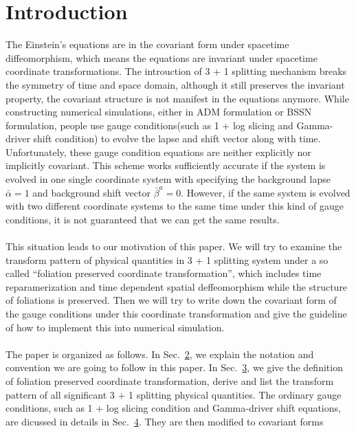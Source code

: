 \documentclass[letterpaper,nofootinbib,prd,amsmath,onecolumn]{revtex4-1}
\begin{document}
\section{Introduction}
The Einstein's equations are in the covariant form under spacetime diffeomorphism, which means the equations are invariant under spacetime coordinate transformations. The introuction of 3 + 1 splitting mechanism breaks the symmetry of time and space domain, although it still preserves the invariant property, the covariant structure is not manifest in the equations anymore. While constructing numerical simulations, either in ADM formulation or BSSN formulation, people use gauge conditions(such as 1 + log slicing and Gamma-driver shift condition) to evolve the lapse and shift vector along with time. Unfortunately, these gauge condition equations are neither explicitly nor implicitly covariant. This scheme works sufficiently accurate if the system is evolved in one single coordinate system with specifying the background lapse ${\bar \alpha} = 1$ and background shift vector ${\bar \beta}^{a} = 0$. However, if the same system is evolved with two different coordinate systems to the same time under this kind of gauge conditions, it is not guaranteed that we can get the same results. \\
\\
This situation leads to our motivation of this paper. We will try to examine the transform pattern of physical quantities in 3 + 1 splitting system under a so called ``foliation preserved coordinate transformation'', which includes time reparamerization and time dependent spatial deffeomorphism while the structure of foliations is preserved. Then we will try to write down the covariant form of the gauge conditions under this coordinate transformation and give the guideline of how to implement this into numerical simulation. 
\\
\\
The paper is organized as follows. In Sec.~\ref{notation}, we explain the notation and convention we are going to follow in this paper. In Sec.~\ref{transform}, we give the definition of foliation preserved coordinate transformation, derive and list the transform pattern of all significant 3 + 1 splitting physical quantities. The ordinary gauge conditions, such as 1 + log slicing condition and Gamma-driver shift equations, are dicussed in details in Sec.~\ref{gauge}. They are then modified to covariant forms

\section{}\label{notation}
\section{}\label{transform}
\section{}\label{gauge}
\end{document}
